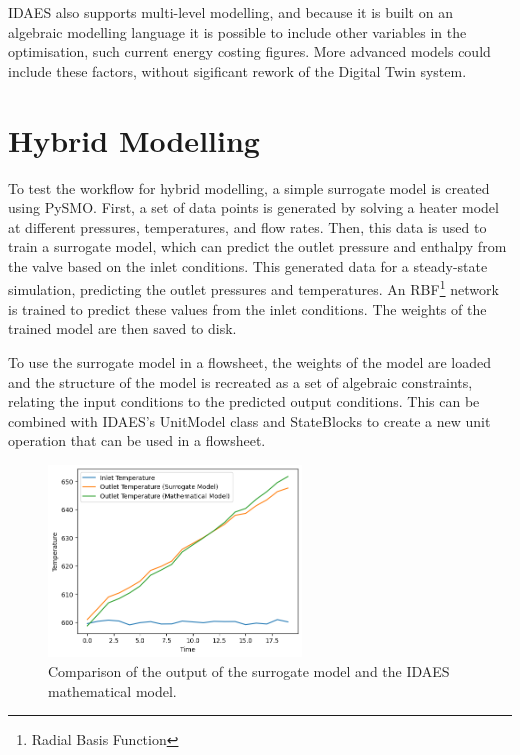 \documentclass[12pt]{article}
\begin{document}
IDAES also supports multi-level modelling, and because it is built on an algebraic modelling language it is possible to include other variables in the optimisation, such current energy costing figures. More advanced models could include these factors, without sigificant rework of the Digital Twin system.


\section{Hybrid Modelling}

To test the workflow for hybrid modelling, a simple surrogate model is created using PySMO. First, a set of data points is generated by solving a heater model at different pressures, temperatures, and flow rates. 
Then, this data is used to train a surrogate model, which can predict the outlet pressure and enthalpy from the valve based on the inlet conditions. 
This generated data for a steady-state simulation, predicting the outlet pressures and temperatures. 
An RBF\footnote{Radial Basis Function} network is trained to predict these values from the inlet conditions.
The weights of the trained model are then saved to disk. 

To use the surrogate model in a flowsheet, the weights of the model are loaded and the structure of the model is recreated as a set of algebraic constraints, relating the input conditions to the predicted output conditions. This can be combined with IDAES's UnitModel class and StateBlocks to create a new unit operation that can be used in a flowsheet.


\begin{figure}
    \centering
    \includegraphics[width=0.6\textwidth]{surrogate_model_accuracy.png}
    \caption{Comparison of the output of the surrogate model and the IDAES mathematical model.}
    \label{fig:surrogate_model}
\end{figure}
\end{document}
